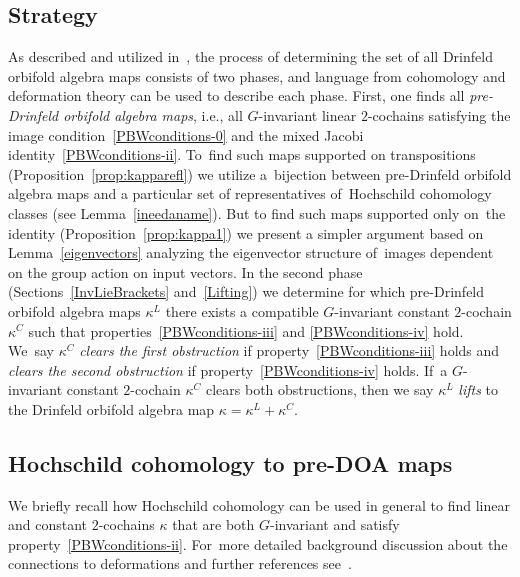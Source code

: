 \documentclass[pdftex]{sigma}
\numberwithin{equation}{section}
\newcommand{\standout}[1]{\textit{#1}} %
\begin{document}
\subsection{Strategy}
As described and utilized in~\cite{FGK}, the process of determining the set
of all Drinfeld orbifold algebra maps consists of two phases, and language
from cohomology and deformation theory can be used to describe each phase.
First, one finds all \standout{pre-Drinfeld orbifold algebra maps},
i.e., all $G$-invariant linear $2$-cochains satisfying the image
condition~\eqref{PBWconditions-0} and the mixed Jacobi identity~\eqref{PBWconditions-ii}.
To~find such maps supported on transpositions (Proposition~\ref{prop:kapparefl}) we utilize
a~bijec\-tion between pre-Drinfeld orbifold algebra maps and a particular
set of representatives of~Hochschild cohomology classes (see Lemma~\ref{ineedaname}).
But to find such maps supported only on~the identity (Proposition~\ref{prop:kappa1})
we present a simpler argument based on Lemma~\ref{eigenvectors}
analyzing the eigenvector structure of~images dependent on the group action
on input vectors.
In the second phase (Sections~\ref{InvLieBrackets} and~\ref{Lifting})
we determine for which
pre-Drinfeld orbifold algebra maps $\kappa^L$ there exists a compatible $G$-invariant
constant $2$-cochain $\kappa^C$ such that properties~\eqref{PBWconditions-iii}
and \eqref{PBWconditions-iv} hold. We~say $\kappa^C$
\standout{clears the first obstruction} if property~\eqref{PBWconditions-iii} holds
and \standout{clears the second obstruction} if property~\eqref{PBWconditions-iv} holds. If~a $G$-invariant constant $2$-cochain $\kappa^C$ clears both obstructions, then
we say $\kappa^L$ \standout{lifts} to the Drinfeld orbifold algebra map $\kappa=\kappa^L+\kappa^C$.

\subsection{Hochschild cohomology to pre-DOA maps}

We briefly recall how Hochschild cohomology can be used in general
to find linear and constant $2$-cochains $\kappa$ that are both $G$-invariant
and satisfy property~\eqref{PBWconditions-ii}. For~more detailed background discussion about the connections to deformations
and further references see~\cite{FGK}.
\end{document}
